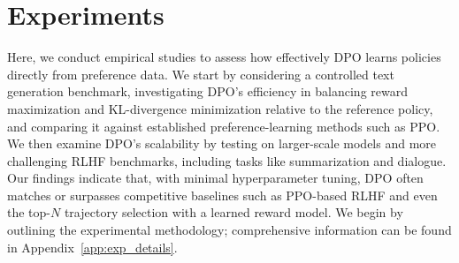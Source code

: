 \section{Experiments}
Here, we conduct empirical studies to assess how effectively DPO learns policies directly from preference data. We start by considering a controlled text generation benchmark, investigating DPO’s efficiency in balancing reward maximization and KL-divergence minimization relative to the reference policy, and comparing it against established preference-learning methods such as PPO. We then examine DPO’s scalability by testing on larger-scale models and more challenging RLHF benchmarks, including tasks like summarization and dialogue. Our findings indicate that, with minimal hyperparameter tuning, DPO often matches or surpasses competitive baselines such as PPO-based RLHF and even the top-$N$ trajectory selection with a learned reward model. We begin by outlining the experimental methodology; comprehensive information can be found in Appendix~\ref{app:exp_details}.

